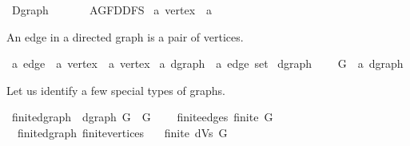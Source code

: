 %
\begin{isabellebody}%
%
%
\isadelimtheory
%
\endisadelimtheory
%
\isatagtheory
{}\isamarkupfalse%
\ Dgraph\isanewline
\ \ \isanewline
\ \ \ \ AGF{\isachardot}{\kern0pt}DDFS\isanewline
{}%
\endisatagtheory
{\isafoldtheory}%
%
\isadelimtheory
\isanewline
%
\endisadelimtheory
\isanewline
{}\isamarkupfalse%
\ {\isacharprime}{\kern0pt}a\ vertex\ {\isacharequal}{\kern0pt}\ {\isacharprime}{\kern0pt}a%
\begin{isamarkuptext}%
An edge in a directed graph is a pair of vertices.%
\end{isamarkuptext}\isamarkuptrue%
\isamarkupfalse%
\ {\isacharprime}{\kern0pt}a\ edge\ {\isacharequal}{\kern0pt}\ {\isachardoublequoteopen}{\isacharparenleft}{\kern0pt}{\isacharprime}{\kern0pt}a\ vertex\ {\isasymtimes}\ {\isacharprime}{\kern0pt}a\ vertex{\isacharparenright}{\kern0pt}{\isachardoublequoteclose}\isanewline
\isanewline
{}\isamarkupfalse%
\ {\isacharprime}{\kern0pt}a\ dgraph\ {\isacharequal}{\kern0pt}\ {\isachardoublequoteopen}{\isacharprime}{\kern0pt}a\ edge\ set{\isachardoublequoteclose}\isanewline
\isanewline
{}\isamarkupfalse%
\ dgraph\ {\isacharequal}{\kern0pt}\isanewline
\ \ \ G\ {\isacharcolon}{\kern0pt}{\isacharcolon}{\kern0pt}\ {\isachardoublequoteopen}{\isacharprime}{\kern0pt}a\ dgraph{\isachardoublequoteclose}%
\begin{isamarkuptext}%
Let us identify a few special types of graphs.%
\end{isamarkuptext}\isamarkuptrue%
\isamarkupfalse%
\ finite{\isacharunderscore}{\kern0pt}dgraph\ {\isacharequal}{\kern0pt}\ dgraph\ G\ \ G\ {\isacharplus}{\kern0pt}\isanewline
\ \ \ finite{\isacharunderscore}{\kern0pt}edges{\isacharcolon}{\kern0pt}\ {\isachardoublequoteopen}finite\ G{\isachardoublequoteclose}\isanewline
\isanewline
{}\isamarkupfalse%
\ {\isacharparenleft}{\kern0pt}\ finite{\isacharunderscore}{\kern0pt}dgraph{\isacharparenright}{\kern0pt}\ finite{\isacharunderscore}{\kern0pt}vertices{\isacharcolon}{\kern0pt}\isanewline
\ \ \ {\isachardoublequoteopen}finite\ {\isacharparenleft}{\kern0pt}dVs\ G{\isacharparenright}{\kern0pt}{\isachardoublequoteclose}\isanewline
%
\isadelimproof
\ \ %
\endisadelimproof
%
\isatagproof

\end{isabellebody}
